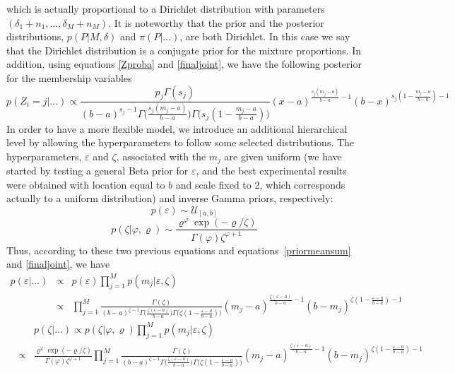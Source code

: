 \documentclass[journal,10pt]{elsart}
\begin{document}
which is actually proportional to a  Dirichlet distribution with parameters
$(\delta_1+n_1,\ldots,\delta_M+n_M)$. It is noteworthy that
the prior and the posterior distributions, $p(P|M,\delta)$ and
$\pi(P|\ldots)$, are both Dirichlet. In this case we say that
the Dirichlet distribution is a conjugate prior for the
mixture proportions. In addition, using equations \ref{Zproba} and \ref{finaljoint}, we have the following posterior for the membership variables
\begin{equation}\label{posteriormembership}
p(Z_i=j|\ldots) \propto \frac{p_j\Gamma(s_j)}{(b-a)^{s_j-1}\Gamma\big(\frac{s_j(m_j-a)}{b-a}\big)\Gamma\big(s_j(1-\frac{m_j-a}{b-a})\big)}(x-a)^{\frac{s_j(m_j-a)}{b-a}-1}(b-x)^{s_j(1-\frac{m_j-a}{b-a})-1}
\end{equation}
In order to have a more flexible model, we introduce an additional hierarchical level by allowing the hyperparameters
to follow some selected distributions. The hyperparameters, $\varepsilon$ and $\zeta$, associated with the $m_{j}$ are given uniform
(we have started by testing a general Beta prior for $\varepsilon$, and the best experimental results were obtained with location equal to $b$ and scale fixed to 2,
which corresponds actually to a uniform distribution) and inverse Gamma priors, respectively:
\begin{equation}\label{priorpriorprior11}
p(\varepsilon) \sim \mathcal{U}_{[a,b]}
\end{equation}
\begin{equation}\label{priorprior99}
p(\zeta|\varphi,\varrho) \sim \frac{\varrho^\varphi\exp(-\varrho/
\zeta)}{\Gamma(\varphi)\zeta^{\varphi+1}}
\end{equation}
Thus, according to these two previous equations and equations~\ref{priormeansum} and \ref{finaljoint}, we have
\begin{eqnarray}\label{posteriorvarepsilon}
p(\varepsilon|\ldots)&\propto& p(\varepsilon)\prod_{j=1}^M p({m}_j|\varepsilon,\zeta)\\\nonumber&\propto& \prod_{j=1}^M \frac{\Gamma(\zeta)}{(b-a)^{\zeta-1}\Gamma\big(\frac{\zeta(\varepsilon-a)}{b-a}\big)\Gamma\big(\zeta(1-\frac{\varepsilon-a}{b-a})\big)}({m}_j-a)^{\frac{\zeta(\varepsilon-a)}{b-a}-1}(b-{m}_j)^{\zeta(1-\frac{\varepsilon-a}{b-a})-1}
\end{eqnarray}
\begin{eqnarray}\label{posteriorzeta}
&&p(\zeta|\ldots)\propto p(\zeta|\varphi,\varrho)\prod_{j=1}^M p({m}_j|\varepsilon,\zeta)\\\nonumber&\propto& \frac{\varrho^\varphi\exp(-\varrho/
\zeta)}{\Gamma(\varphi)\zeta^{\varphi+1}} \prod_{j=1}^M \frac{\Gamma(\zeta)}{(b-a)^{\zeta-1}\Gamma\big(\frac{\zeta(\varepsilon-a)}{b-a}\big)\Gamma\big(\zeta(1-\frac{\varepsilon-a}{b-a})\big)}({m}_j-a)^{\frac{\zeta(\varepsilon-a)}{b-a}-1}(b-{m}_j)^{\zeta(1-\frac{\varepsilon-a}{b-a})-1}
\end{eqnarray}
\end{document}

